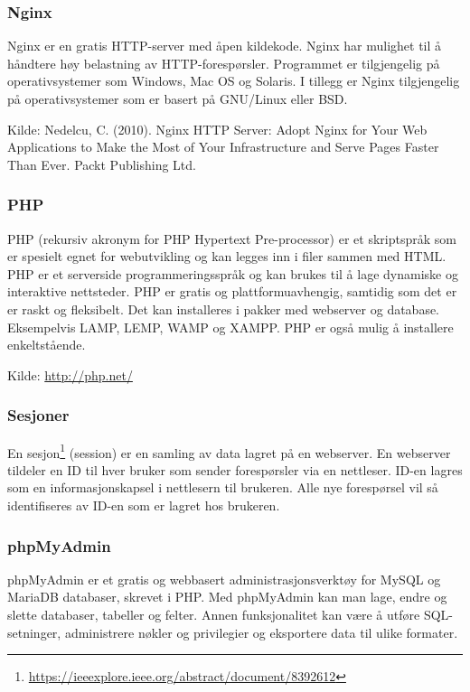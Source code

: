 \subsubsection{Nginx}
Nginx er en gratis HTTP-server med åpen kildekode. Nginx har mulighet til å håndtere høy belastning av HTTP-forespørsler. Programmet er tilgjengelig på operativsystemer som Windows, Mac OS og Solaris. I tillegg er Nginx tilgjengelig på operativsystemer som er basert på GNU/Linux eller BSD.

Kilde: Nedelcu, C. (2010). Nginx HTTP Server: Adopt Nginx for Your Web Applications to Make the Most of Your Infrastructure and Serve Pages Faster Than Ever. Packt Publishing Ltd.

\subsubsection{PHP}
PHP (rekursiv akronym for PHP Hypertext Pre-processor) er et skriptspråk som er spesielt egnet for webutvikling og kan legges inn i filer sammen med HTML. PHP er et serverside programmeringsspråk og kan brukes til å lage dynamiske og interaktive nettsteder. PHP er gratis og plattformuavhengig, samtidig som det er  er raskt og fleksibelt. Det kan installeres i pakker med webserver og database. Eksempelvis LAMP, LEMP, WAMP og XAMPP. PHP er også mulig å installere enkeltstående. 

Kilde: \url{http://php.net/}

\subsubsection{Sesjoner}
En sesjon\footnote{\url{https://ieeexplore.ieee.org/abstract/document/8392612}} (session) er en samling av data lagret på en webserver. En webserver tildeler en ID til hver bruker som sender forespørsler via en nettleser. ID-en lagres som en informasjonskapsel i nettlesern til brukeren. Alle nye forespørsel vil så identifiseres av ID-en som er lagret hos brukeren.

\subsubsection{phpMyAdmin}
phpMyAdmin \cite{phpmyadmin2019bmt} er et gratis og webbasert administrasjonsverktøy for MySQL og MariaDB databaser, skrevet i PHP. Med phpMyAdmin kan man lage, endre og slette databaser, tabeller og felter. Annen funksjonalitet kan være å utføre SQL-setninger, administrere nøkler og privilegier og eksportere data til ulike formater.

